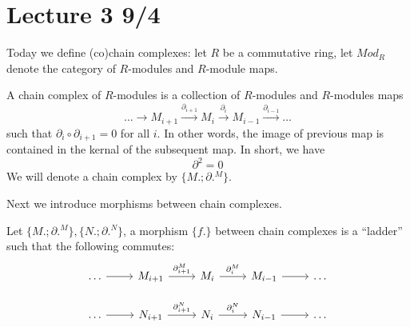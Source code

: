 \section{Lecture 3 9/4}
Today we define (co)chain complexes: let $R$ be a commutative ring, let $Mod_R$ denote the category of $R$-modules and $R$-module maps.
\begin{defn}
    A chain complex of $R$-modules is a collection of $R$-modules and $R$-modules maps 
    \begin{equation*}
        \dots\to M_{i+1}\xrightarrow{\partial_{i+1}}M_i\xrightarrow{\partial_i}M_{i-1}\xrightarrow{\partial_{i-1}}\dots
    \end{equation*}
    such that $\partial_i\circ\partial_{i+1}=0$ for all $i$. In other words, the image of previous map is contained in the kernal of the subsequent map. In short, we have 
    \begin{equation*}
        \partial^2=0
    \end{equation*}
    We will denote a chain complex by $\{M.; \partial.^M\}$.
\end{defn}
Next we introduce morphisms between chain complexes.
\begin{defn}
    Let $\{M.;\partial.^M\}, \{N.;\partial.^N\}$, a morphism $\{f.\}$ between chain complexes is a ``ladder'' such that the following commutes:
    \[\begin{tikzcd}
        \dots & {M_{i+1}} & {M_i} & {M_{i-1}} & \dots \\
        \dots & {N_{i+1}} & {N_i} & {N_{i-1}} & \dots
        \arrow[from=1-1, to=1-2]
        \arrow["{\partial_{i+1}^M}", from=1-2, to=1-3]
        \arrow["{\partial_i^M}", from=1-3, to=1-4]
        \arrow[from=1-4, to=1-5]
        \arrow[from=2-1, to=2-2]
        \arrow["{\partial_{i+1}^N}", from=2-2, to=2-3]
        \arrow["{\partial_{i}^N}", from=2-3, to=2-4]
        \arrow[from=2-4, to=2-5]
    \end{tikzcd}\]
    
\end{defn}




